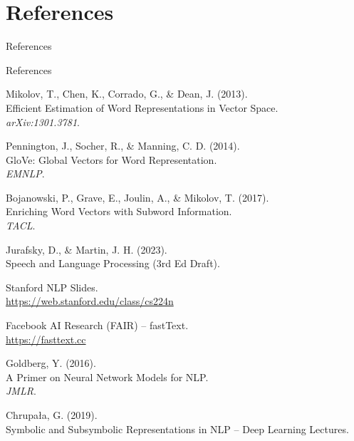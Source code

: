 \section{References}
\begin{frame}{}
    \LARGE References
\end{frame}

\begin{frame}[allowframebreaks]{References}
    \begin{thebibliography}{8}
        Mikolov, T., Chen, K., Corrado, G., \& Dean, J. (2013).\\
        Efficient Estimation of Word Representations in Vector Space.\\
        \textit{arXiv:1301.3781}.

        Pennington, J., Socher, R., \& Manning, C. D. (2014).\\
        GloVe: Global Vectors for Word Representation.\\
        \textit{EMNLP}.

        Bojanowski, P., Grave, E., Joulin, A., \& Mikolov, T. (2017).\\
        Enriching Word Vectors with Subword Information.\\
        \textit{TACL}.

        Jurafsky, D., \& Martin, J. H. (2023).\\
        Speech and Language Processing (3rd Ed Draft).

        Stanford NLP Slides.\\
        \url{https://web.stanford.edu/class/cs224n}

        Facebook AI Research (FAIR) – fastText.\\
        \url{https://fasttext.cc}

        Goldberg, Y. (2016).\\
        A Primer on Neural Network Models for NLP.\\
        \textit{JMLR}.

        Chrupała, G. (2019).\\
        Symbolic and Subsymbolic Representations in NLP – Deep Learning Lectures.
    \end{thebibliography}
\end{frame}